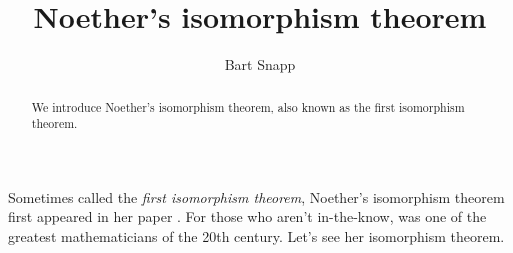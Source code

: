 \documentclass{ximera}
\author{Bart Snapp}
\title{Noether's isomorphism theorem}
\begin{document}
\begin{abstract}
  We introduce Noether's isomorphism theorem, also known as the first
  isomorphism theorem.
\end{abstract}
\maketitle

Sometimes called the \textit{first isomorphism theorem}, Noether's
isomorphism theorem first appeared in her paper .
For those who aren't in-the-know,  was one of the
greatest mathematicians of the 20th century. Let's see her isomorphism theorem.
\end{document}
